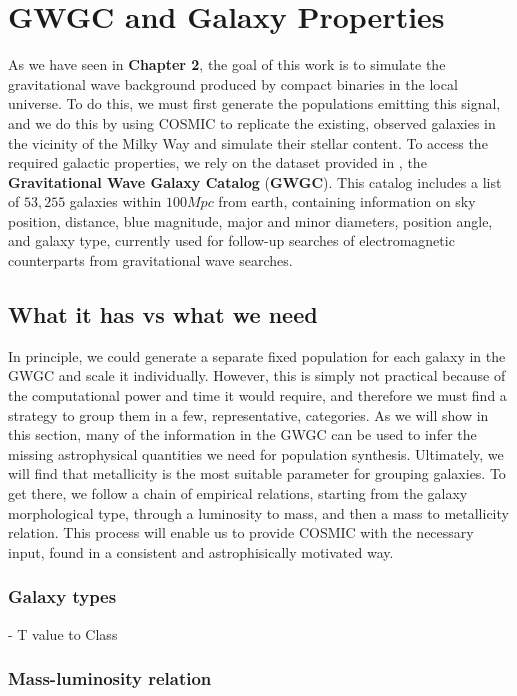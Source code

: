 \chapter{GWGC and Galaxy Properties}
As we have seen in \textbf{Chapter 2}, the goal of this work is to simulate the gravitational wave background produced by compact binaries in the local universe.
To do this, we must first generate the populations emitting this signal, and we do this by using COSMIC to replicate the existing, observed galaxies in the vicinity of the Milky Way and simulate their stellar content.
To access the required galactic properties, we rely on the dataset provided in \cite{GWGC}, the \textbf{Gravitational Wave Galaxy Catalog} (\textbf{GWGC}).
This catalog includes a list of $53,255$ galaxies within $100Mpc$ from earth, containing information on sky position, distance, blue magnitude, major and minor diameters, position angle, and galaxy type, currently used for follow-up searches of electromagnetic counterparts from gravitational wave searches.

\section{What it has vs what we need}
In principle, we could generate a separate fixed population for each galaxy in the GWGC and scale it individually.
However, this is simply not practical because of the computational power and time it would require, and therefore we must find a strategy to group them in a few, representative, categories.
As we will show in this section, many of the information in the GWGC can be used to infer the missing astrophysical quantities we need for population synthesis. 
Ultimately, we will find that metallicity is the most suitable parameter for grouping galaxies.
To get there, we follow a chain of empirical relations, starting from the galaxy morphological type, through  a luminosity to mass, and then a mass to metallicity relation. 
This process will enable us to provide COSMIC with the necessary input, found in a consistent and astrophisically motivated way.

\subsection{Galaxy types}

    - T value to Class

\subsection{Mass-luminosity relation}

